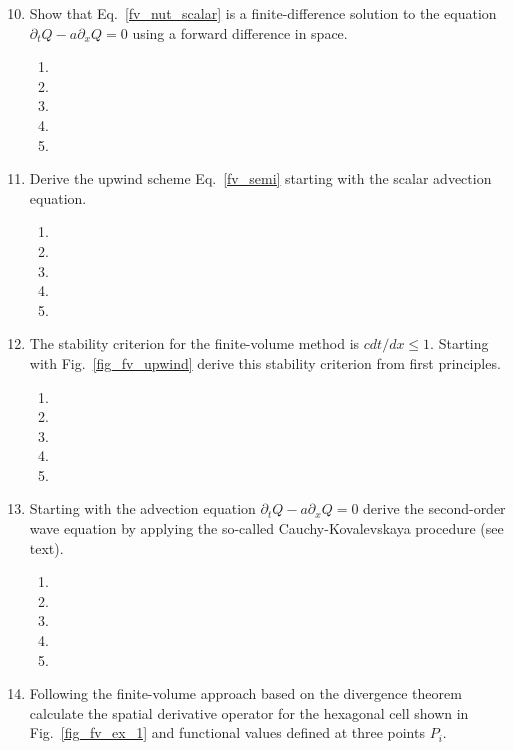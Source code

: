 \begin{enumerate}
\setcounter{enumi}{9}
\item
Show that Eq.~\ref{fv_nut_scalar} is a finite-difference solution to the equation $\partial_t Q-a\partial_x Q=0$ using a forward difference in space. 
\begin{enumerate}
\item[]
\item[]
\item[] 
\item[]
\item[] 
\end{enumerate}
\item  
Derive the upwind scheme Eq.~\ref{fv_semi} starting with the scalar advection equation. 
\begin{enumerate}
\item[]
\item[]
\item[] 
\item[]
\item[] 
\end{enumerate}
\item
The stability criterion for the finite-volume method is $c dt/dx \leq 1$.  Starting with Fig.~\ref{fig_fv_upwind} derive this stability criterion from first principles. 
\begin{enumerate}
\item[]
\item[]
\item[] 
\item[]
\item[] 
\end{enumerate}
\item
Starting with the advection equation $\partial_t Q-a\partial_x Q=0$ derive the second-order wave equation by applying the so-called Cauchy-Kovalevskaya procedure (see text).
\begin{enumerate}
\item[]
\item[]
\item[] 
\item[]
\item[] 
\end{enumerate}
\item
Following the finite-volume approach based on the divergence theorem calculate the spatial derivative operator for the hexagonal cell shown in Fig.~\ref{fig_fv_ex_1} and functional values defined at three points $P_i$. 

\end{enumerate}
